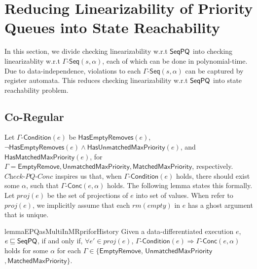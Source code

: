 \section{Reducing Linearizability of Priority Queues into State Reachability}
\label{sec:co-regular of extended priority queues}

In this section, we divide checking linearizability w.r.t $\mathsf{SeqPQ}$ into checking linearizablity w.r.t $\Gamma\mathsf{\text{-}Seq}(s,\alpha)$, each of which can be done in polynomial-time. Due to data-independence, violations to each $\Gamma\mathsf{\text{-}Seq}(s,\alpha)$ can be captured by register automata. This reduces checking linearizability w.r.t $\mathsf{SeqPQ}$ into state reachability problem.



\subsection{Co-Regular}
\label{subsec:definition of co-regular}

Let $\Gamma\mathsf{\text{-}Condition}(e)$ be $\mathsf{HasEmptyRemoves}(e)$, $\neg \mathsf{HasEmptyRemoves}(e) \wedge \mathsf{HasUnmatchedMaxPriority}(e)$, and $\mathsf{HasMatchedMaxPriority}(e)$, for $\Gamma = \mathsf{EmptyRemove}, \mathsf{UnmatchedMaxPriority}, \mathsf{MatchedMaxPriority}$, respectively. $\textit{Check-PQ-Conc}$ inspires us that, when $\Gamma\mathsf{\text{-}Condition}(e)$ holds, there should exist some $\alpha$, such that  $\Gamma\mathsf{\text{-}Conc}(e,\alpha)$ holds. The following lemma states this formally. Let $\textit{proj}(e)$ be the set of projections of $e$ into set of values. When refer to $\textit{proj}(e)$, we implicitly assume that each $\textit{rm}(\textit{empty})$ in $e$ has a ghost argument that is unique.

\begin{restatable}{lemma}{EPQasMultiInMRpriforHistory}
\label{lemma:EPQ as multi in MRpri for history}
Given a data-differentiated execution $e$, $e \sqsubseteq \mathsf{SeqPQ}$, if and only if, $\forall e' \in \textit{proj}(e)$, $\Gamma\mathsf{\text{-}Condition}(e) \Rightarrow \Gamma\mathsf{\text{-}Conc}(e,\alpha)$ holds for some $\alpha$ for each $\Gamma\in \{\mathsf{EmptyRemove}$, $\mathsf{UnmatchedMaxPriority}$ $,\mathsf{MatchedMaxPriority}\}$.
\end{restatable}

